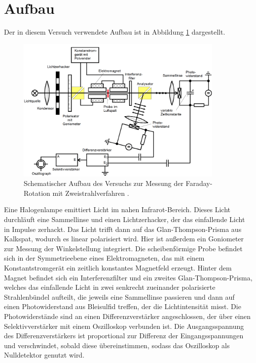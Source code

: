 \section{Aufbau}
Der in diesem Versuch verwendete Aufbau ist in Abbildung \ref{fig:aufbau} dargestellt.
\FloatBarrier
\begin{figure}[h]
    \centering
    \includegraphics[width=0.9\textwidth]{aufbau.png}
    \caption{Schematischer Aufbau des Versuchs zur Messung der Faraday-Rotation mit Zweistrahlverfahren \cite{quelle03}.}
    \label{fig:aufbau}
\end{figure}
\FloatBarrier
\noindent
Eine Halogenlampe emittiert Licht im nahen Infrarot-Bereich. Dieses Licht durchläuft eine Sammellinse und einen 
Lichtzerhacker, der das einfallende Licht in Impulse zerhackt. Das Licht trifft dann auf das Glan-Thompson-Prisma aus
Kalkspat, wodurch es linear polarisiert wird. Hier ist außerdem ein Goniometer zur Messung der Winkelstellung integriert. 
Die scheibenförmige Probe befindet sich in der Symmetrieebene eines Elektromagneten, das mit einem Konstantstromgerät 
ein zeitlich konstantes Magnetfeld erzeugt. Hinter dem Magnet befindet sich ein Interferenzfilter und ein zweites 
Glan-Thompson-Prisma, welches das einfallende Licht in zwei senkrecht zueinander polarisierte Strahlenbündel aufteilt,
die jeweils eine Sammellinse passieren und dann auf einen Photowiderstand aus Bleisulfid treffen, der die Lichtintensität misst. 
Die Photowiderstände sind an einen Differenzverstärker angeschlossen, der über einen Selektivverstärker mit
einem Oszilloskop verbunden ist. Die Ausgangsspannung des Differenzverstärkers ist proportional zur Differenz der 
Eingangsspannungen und verschwindet, sobald diese übereinstimmen, sodass das Oszilloskop als Nulldetektor genutzt wird.

